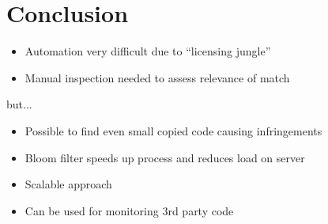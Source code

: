 
\section{Conclusion}


\begin{frame}{\insertsection}
	\begin{itemize}
		\small
		\item Automation very difficult due to ``licensing jungle''
		\item Manual inspection needed to assess relevance of match
	\end{itemize}
	but...
	\begin{itemize}
		\small
		\item Possible to find even small copied code causing infringements
		\item Bloom filter speeds up process and reduces load on server
		\item Scalable approach
		\item Can be used for monitoring 3rd party code
	\end{itemize}
\end{frame}